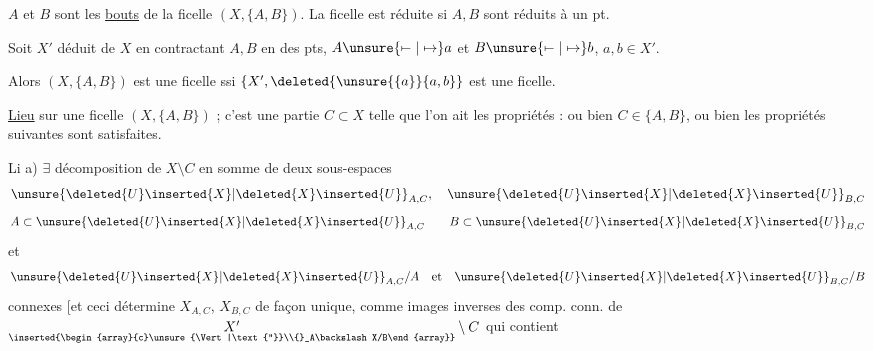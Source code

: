

$A$ et $B$ sont les \uline{bouts}  de la ficelle $(X,\{A,B\})$.
La ficelle est réduite si $A,B$ sont réduits à un pt.

Soit $X'$ déduit de $X$ en contractant $A,B$ en des pts,
$A\unsure{\mapstochar\relbar|\mapsto}a$ et $B\unsure{\mapstochar\relbar|\mapsto}b$,
$a,b\in X'$.


Alors $(X,\{A,B\})$ est une ficelle ssi
$\{X',\deleted{\unsure{\{a}}\{a,b\}\}$ est une ficelle.



\uline{Lieu} sur une ficelle $(X,\{A,B\})$ ;
c'est une partie  $C\subset X$ telle que
l'on ait les propriétés : ou bien $C\in\{A,B\}$,
ou bien les propriétés suivantes sont satisfaites.




Li a) $\exists$ décomposition de $X\setminus C$ en somme  de deux sous-espaces
\[
\unsure{\deleted{U}\inserted{X}|\deleted{X}\inserted{U}}_{A,C},\quad \unsure{\deleted{U}\inserted{X}|\deleted{X}\inserted{U}}_{B,C}
\]
\[
A\subset\unsure{\deleted{U}\inserted{X}|\deleted{X}\inserted{U}}_{A,C}
\qquad
B\subset\unsure{\deleted{U}\inserted{X}|\deleted{X}\inserted{U}}_{B,C}
\]
et
\[
\unsure{\deleted{U}\inserted{X}|\deleted{X}\inserted{U}}_{A,C}/A
\quad\text{et}\quad
\unsure{\deleted{U}\inserted{X}|\deleted{X}\inserted{U}}_{B,C}/B
\]
connexes
[et ceci détermine $X_{A,C}$, $X_{B,C}$ de façon unique,
comme images inverses des comp. conn. de
$\underset{\inserted{\begin{array}{c}\unsure{\Vert|\text{''}}\\{}_A\backslash X/B\end{array}}}{X'}\setminus C$
qui contient

